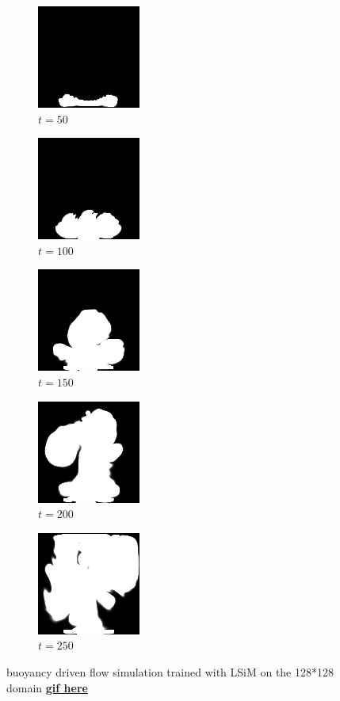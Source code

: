 \documentclass[a4paper,12pt,twoside]{report}
\begin{document}
\begin{figure}
	\centering
	\begin{subfigure}{0.18\textwidth}
		\centering
		\includegraphics[scale=0.56]{buoyancy_test/dens_000050_lsim.png}
		\caption{$t=50$}
	\end{subfigure}
	\begin{subfigure}{0.18\textwidth}
		\centering
		\includegraphics[scale=0.56]{buoyancy_test/dens_000100_lsim.png}
		\caption{$t=100$}
	\end{subfigure}
	\begin{subfigure}{0.18\textwidth}
		\centering
		\includegraphics[scale=0.56]{buoyancy_test/dens_000150_lsim.png}
		\caption{$t=150$}
	\end{subfigure}
	\begin{subfigure}{0.18\textwidth}
		\centering
		\includegraphics[scale=0.56]{buoyancy_test/dens_000200_lsim.png}
		\caption{$t=200$}
	\end{subfigure}
	\begin{subfigure}{0.18\textwidth}
		\centering
		\includegraphics[scale=0.56]{buoyancy_test/dens_000249_lsim.png}
		\caption{$t=250$}
	\end{subfigure}
	\caption{buoyancy driven flow simulation trained with LSiM on the 128*128 domain \href{https://github.com/w191444052/sol-data/blob/master/buoyancy_high/lsim.gif}{\bf{gif here}}}
	\label{sol buoyancy high lsim}
\end{figure}
\end{document}
